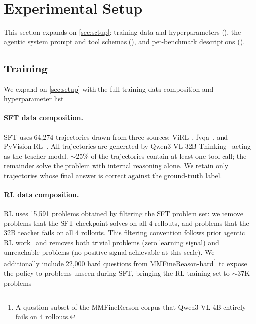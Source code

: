 \newpage
\section{Experimental Setup}
\label{app:setup}

This section expands on \autoref{sec:setup}: training data and hyperparameters (), the agentic system prompt and tool schemas (), and per-benchmark descriptions ().

\subsection{Training}
\label{app:training-setup}

We expand on \autoref{sec:setup} with the full training data composition and hyperparameter list.

\paragraph{SFT data composition.}
SFT uses 64{,}274 trajectories drawn from three sources: ViRL~\citep{virl}, fvqa~\citep{fvqa}, and PyVision-RL~\citep{pyvision-rl}. All trajectories are generated by Qwen3-VL-32B-Thinking~\citep{Qwen3VL} acting as the teacher model. $\sim$25\% of the trajectories contain at least one tool call; the remainder solve the problem with internal reasoning alone. We retain only trajectories whose final answer is correct against the ground-truth label.

\paragraph{RL data composition.}
RL uses 15{,}591 problems obtained by filtering the SFT problem set: we remove problems that the SFT checkpoint solves on all 4 rollouts, and problems that the 32B teacher fails on all 4 rollouts. This filtering convention follows prior agentic RL work~\citep{deepeyesv2, prorl} and removes both trivial problems (zero learning signal) and unreachable problems (no positive signal achievable at this scale). We additionally include 22{,}000 hard questions from MMFineReason-hard\footnote{A question subset of the MMFineReason corpus that Qwen3-VL-4B entirely fails on 4 rollouts.} to expose the policy to problems unseen during SFT, bringing the RL training set to $\sim$37K problems.

